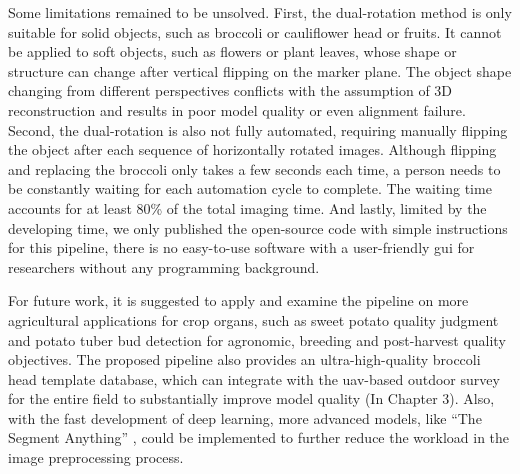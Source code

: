 Some limitations remained to be unsolved. First, the dual-rotation method is only suitable for solid objects, such as broccoli or cauliflower head or fruits. It cannot be applied to soft objects, such as flowers or plant leaves, whose shape or structure can change after vertical flipping on the marker plane. The object shape changing from different perspectives conflicts with the assumption of 3D reconstruction and results in poor model quality or even alignment failure. Second, the dual-rotation is also not fully automated, requiring manually flipping the object after each sequence of horizontally rotated images. Although flipping and replacing the broccoli only takes a few seconds each time, a person needs to be constantly waiting for each automation cycle to complete. The waiting time accounts for at least 80\% of the total imaging time. And lastly, limited by the developing time, we only published the open-source code with simple instructions for this pipeline, there is no easy-to-use software with a user-friendly \gls{gui} for researchers without any programming background.

For future work, it is suggested to apply and examine the pipeline on more agricultural applications for crop organs, such as sweet potato quality judgment and potato tuber bud detection for agronomic, breeding and post-harvest quality objectives. The proposed pipeline also provides an ultra-high-quality broccoli head template database, which can integrate with the \gls{uav}-based outdoor survey for the entire field to substantially improve model quality (In Chapter 3). Also, with the fast development of deep learning, more advanced models, like ``The Segment Anything'' \citep{kirillov_segment_2023}, could be implemented to further reduce the workload in the image preprocessing process.
